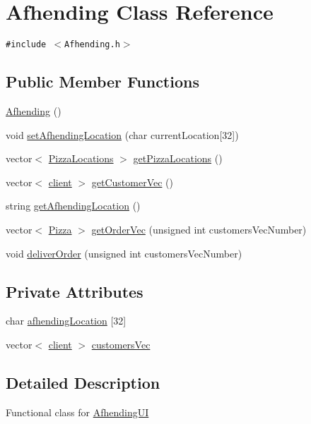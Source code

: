 \hypertarget{class_afhending}{
\section{Afhending Class Reference}
\label{class_afhending}
}
{\tt \#include $<$Afhending.h$>$}

\subsection*{Public Member Functions}
\begin{CompactItemize}
\item 
\hyperlink{class_afhending_9365433a6f973ad929ffc0b458bc7c6f}{Afhending} ()
\item 
void \hyperlink{class_afhending_411cc45b50d4a59a33d76f6c54e52f78}{set\-Afhending\-Location} (char current\-Location\mbox{[}32\mbox{]})
\item 
vector$<$ \hyperlink{class_pizza_locations}{Pizza\-Locations} $>$ \hyperlink{class_afhending_3d38e7498fba59674c7d3838bf4c1824}{get\-Pizza\-Locations} ()
\item 
vector$<$ \hyperlink{classclient}{client} $>$ \hyperlink{class_afhending_3970b0afe27b514282442b11592e1602}{get\-Customer\-Vec} ()
\item 
string \hyperlink{class_afhending_543bc751e47e95a5382a13e161387a1b}{get\-Afhending\-Location} ()
\item 
vector$<$ \hyperlink{class_pizza}{Pizza} $>$ \hyperlink{class_afhending_ad0cbeddec394b25c5eade57247f4110}{get\-Order\-Vec} (unsigned int customers\-Vec\-Number)
\item 
void \hyperlink{class_afhending_1d223b1559fc42935dfef28841735951}{deliver\-Order} (unsigned int customers\-Vec\-Number)
\end{CompactItemize}
\subsection*{Private Attributes}
\begin{CompactItemize}
\item 
char \hyperlink{class_afhending_85acd631eb078696afb9935bedeeb107}{afhending\-Location} \mbox{[}32\mbox{]}
\item 
vector$<$ \hyperlink{classclient}{client} $>$ \hyperlink{class_afhending_52cc86469dd41b9be5b7186d6bd00589}{customers\-Vec}
\end{CompactItemize}


\subsection{Detailed Description}
Functional class for \hyperlink{class_afhending_u_i}{Afhending\-UI} 



